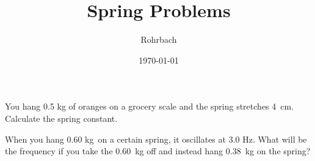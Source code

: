 \documentclass[10pt]{exam}
\title{Spring Problems}
\author{Rohrbach}
\date{\today}
\begin{document}
\maketitle

\begin{questions}
  
  \question
    You hang 0.5 kg of oranges on a grocery scale and the spring stretches 4~cm. Calculate the spring constant.
    \vs

  \question
    When you hang 0.60 kg~on a certain spring, it oscillates at 3.0 Hz. What will be the frequency if you take the 0.60~kg off and instead hang 0.38~kg on the spring?
    \vs

\end{questions}
\end{document}
